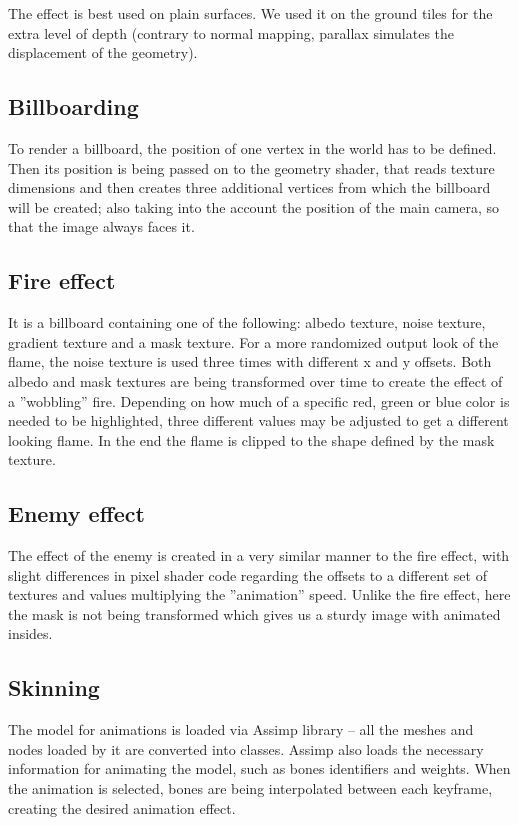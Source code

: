 \documentclass[12pt, english]{article}
\begin{document}
The effect is best used on plain surfaces. We used it on the ground tiles for the extra level of depth (contrary to normal mapping, parallax simulates the displacement of the geometry).

\subsection{Billboarding}
To render a billboard, the position of one vertex in the world has to be
defined.  Then its position is being passed on to the geometry shader, that
reads texture dimensions and then creates three additional vertices from which
the billboard will be created; also taking into the account the position of the
main camera, so that the image always faces it.

\subsection{Fire effect}
It is a billboard containing one of the following: albedo texture, noise
texture, gradient texture and a mask texture. For a more randomized output look
of the flame, the noise texture is used three times with different x and y
offsets.  Both albedo and mask textures are being transformed over time to
create the effect of a ''wobbling'' fire. Depending on how much of a specific
red, green or blue color is needed to be highlighted, three different values
may be adjusted to get a different looking flame. In the end the flame is
clipped to the shape defined by the mask texture.

\subsection{Enemy effect}
The effect of the enemy is created in a very similar manner to the fire effect,
with slight differences in pixel shader code regarding the offsets to a
different set of textures and values multiplying the ''animation'' speed.
Unlike the fire effect, here the mask is not being transformed which gives us a
sturdy image with animated insides.

\subsection{Skinning}
The model for animations is loaded via Assimp library -- all the meshes and
nodes loaded by it are converted into classes. Assimp also loads the necessary
information for animating the model, such as bones identifiers and weights.
When the animation is selected, bones are being interpolated between each
keyframe, creating the desired animation effect.
\end{document}
